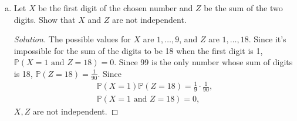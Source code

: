 \documentclass[addpoints, 11pt]{exam}
\newcommand*{\prob}{\mathds{P}}
\begin{document}
\begin{description}
\begin{enumerate}[(a)]
        \item  Let $X$ be the first digit of the chosen number and $Z$ be the sum of the two digits. Show that $X$ and $Z$ are not independent.

        \begin{proof}[Solution]
            The possible values for $X$ are $1, \dots, 9$, and $Z$ are $1, \dots, 18$. Since it's impossible for the sum of the digits to be 18 when the first digit is 1, $\prob(X = 1 \text{ and } Z = 18) = 0$. Since 99 is the only number whose sum of digits is 18, $\prob(Z = 18) = \frac{1}{90}$.
            Since 
            \begin{gather}
                \prob(X = 1)\prob(Z = 18) = \frac{1}{9} \cdot \frac{1}{90}, \\
                \prob(X = 1 \text{ and } Z = 18) = 0,
            \end{gather}
            $X, Z$ are not independent.
            
        \end{proof}
    \end{enumerate}
    
\end{description}
\end{document}
